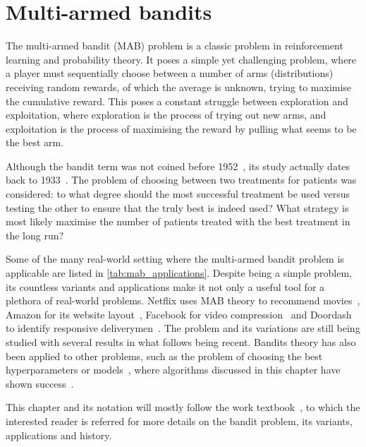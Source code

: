 \chapter{Multi-armed bandits}
\label{chap:bandits}

The multi-armed bandit (MAB) problem is a classic problem in reinforcement learning and probability theory.
It poses a simple yet challenging problem, where a player must sequentially choose between a number of arms (distributions) receiving random rewards, of which the average is unknown, trying to maximise the cumulative reward.
This poses a constant struggle between exploration and exploitation, where exploration is the process of trying out new arms, and exploitation is the process of maximising the reward by pulling what seems to be the best arm.

Although the bandit term was not coined before 1952~\autocite{robbins1952}, its study actually dates back to 1933~\autocite{thompson1933}.
The problem of choosing between two treatments for patients was considered: to what degree should the most successful treatment be used versus testing the other to ensure that the truly best is indeed used?
What strategy is most likely maximise the number of patients treated with the best treatment in the long run?

Some of the many real-world setting where the multi-armed bandit problem is applicable are listed in \cref{tab:mab_applications}.
Despite being a simple problem, its countless variants and applications make it not only a useful tool for a plethora of real-world problems.
Netflix uses MAB theory to recommend movies~\autocite{kawale2018}, Amazon for its website layout~\autocite{hill2017}, Facebook for video compression~\autocite{daulton2019} and Doordash to identify responsive deliverymen~\autocite{sharma2022}.
The problem and its variations are still being studied with several results in what follows being recent.
Bandits theory has also been applied to other problems, such as the problem of choosing the best hyperparameters or models~\autocite{gagliolo2010}, where algorithms discussed in this chapter have shown success~\autocite{wang2014,bouneffouf2017}.


This chapter and its notation will mostly follow the work textbook~\autocite{lattimore2020}, to which the interested reader is referred for more details on the bandit problem, its variants, applications and history.

